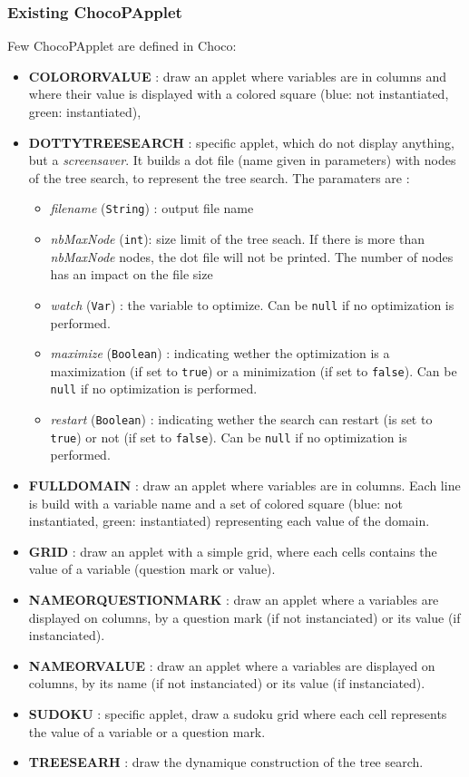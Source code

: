 \subsubsection{Existing ChocoPApplet}\label{chocoandvisu:existingchocopapplet}\hypertarget{chocoandvisu:existingchocopapplet}{}
Few ChocoPApplet are defined in Choco:
\begin{itemize}
	\item \textbf{COLORORVALUE} : draw an applet where variables are in columns and where their value is displayed with a colored square (blue: not instantiated, green: instantiated),
	\item \textbf{DOTTYTREESEARCH} : specific applet, which do not display anything, but a \emph{screensaver}. It builds a dot file (name given in parameters) with nodes of the tree search, to represent the tree search. The paramaters are :
	\begin{itemize}
		\item \emph{filename} (\texttt{String}) : output file name
		\item \emph{nbMaxNode} (\texttt{int}): size limit of the tree seach. If there is more than \emph{nbMaxNode} nodes, the dot file will not be printed. The number of nodes has an impact on the file size
		\item \emph{watch} (\texttt{Var}) : the variable to optimize. Can be \texttt{null} if no optimization is performed.
		\item \emph{maximize} (\texttt{Boolean}) : indicating wether the optimization is a maximization (if set to \texttt{true}) or a minimization (if set to \texttt{false}). Can be \texttt{null} if no optimization is performed.
		\item \emph{restart} (\texttt{Boolean}) : indicating wether the search can restart (is set to \texttt{true}) or not (if set to \texttt{false}). Can be \texttt{null} if no optimization is performed.
	\end{itemize}
	\item \textbf{FULLDOMAIN} : draw an applet where variables are in columns. Each line is build with a variable name and a set of colored square (blue: not instantiated, green: instantiated) representing each value of the domain.
	\item \textbf{GRID} : draw an applet with a simple grid, where each cells contains the value of a variable (question mark or value).
	\item \textbf{NAMEORQUESTIONMARK} : draw an applet where a variables are displayed on columns, by a question mark (if not instanciated) or its value (if instanciated).
	\item \textbf{NAMEORVALUE} : draw an applet where a variables are displayed on columns, by its name (if not instanciated) or its value (if instanciated).
	\item \textbf{SUDOKU} : specific applet, draw a sudoku grid where each cell represents the value of a variable or a question mark.
	\item \textbf{TREESEARH} : draw the dynamique construction of the tree search.
\end{itemize}

